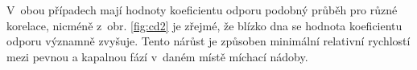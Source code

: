 
 V~obou případech mají hodnoty koeficientu odporu podobný průběh pro různé korelace, nicméně z~obr. \ref{fig:cd2} je zřejmé, že blízko dna se hodnota koeficientu odporu významně zvyšuje. Tento nárůst je způsoben minimální relativní rychlostí mezi pevnou a kapalnou fází v~daném místě míchací nádoby.